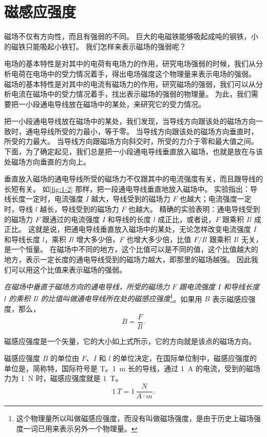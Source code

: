 \section{磁感应强度}
磁场不仅有方向性，而且有强弱的不同。
巨大的电磁铁能够吸起成吨的钢铁，小的磁铁只能吸起小铁钉。
我们怎样来表示磁场的强弱呢？

电场的基本特性是对其中的电荷有电场力的作用，研究电场强弱的时候，我们从分析电荷在电场中的受力情况着手，得出电场强度这个物理量来表示电场的强弱。
磁场的基本特性是对其中的电流有磁场力的作用，研究磁场的强弱，我们可以从分析电流在磁场中的受力情况着手，找出表示磁场的强弱的物理量。
为此，我们需要把一小段通电导线放在磁场中的某处，来研究它的受力情况。

把一小段通电导线放在磁场中的某处，我们发现，当导线方向跟该处的磁场方向一致时，通电导线所受的力最小，等于零。
当导线方向跟该处的磁场方向垂直时，所受的力最大。
当导线方向跟磁场方向斜交时，所受的力介于零和最大值之间。
下面，为了确定起见，我们总是把一小段通电导线垂直放入磁场，也就是放在与该处磁场方向垂直的方向上。

垂直放入磁场的通电导线所受的磁场力不仅跟其中的电流强度有关，而且跟导线的长短有关。
如\cref{fig:1-2} 那样，把一段通电导线垂直地放入磁场中。
实验指出：导线长度一定时，电流强度 $I$ 越大，导线受到的磁场力 $F$ 也越大；电流强度一定时，导线 $l$ 越长，导线受到的磁场力 $F$ 也越大。
精确的实验表明：通电导线受到的磁场力 $F$ 跟通过的电流强度 $I$ 和导线的长度 $l$ 成正比，或者说，$F$ 跟乘积 $Il$ 成正比。
这就是说，把通电导线垂直放入磁场中的某处，无论怎样改变电流强度 $I$ 和导线长度 $l$，乘积 $Il$ 增大多少倍，$F$ 也增大多少倍，比值 $F/Il$ 跟乘积 $Il$ 无关，是一个恒量。
在磁场中不同的地方，这个比值可以是不同的值，这个比值越大的地方，表示一定长度的通电导线受到的磁场力越大，即那里的磁场越强。
因此我们可以用这个比值来表示磁场的强弱。

\emph{在磁场中垂直于磁场方向的通电导线，所受的磁场力 $F$ 跟电流强度 $I$ 和导线长度 $l$ 的乘积 $Il$ 的比值叫做通电导线所在处的磁感应强度}\footnote{这个物理量所以叫做磁感应强度，而没有叫做磁场强度，是由于历史上磁场强度一词已用来表示另外一个物理量。}。如果用 $B$ 表示磁感应强度，那么，
\[B=\frac{F}{Il}.\]

磁感应强度是一个矢量，它的大小如上式所示，它的方向就是该点的磁场方向。

磁感应强度 $B$ 的单位由 $F$、$I$ 和 $l$ 的单位决定，在国际单位制中，磁感应强度的单位是，简称特，国际符号是 \unit{T}。\qty{1}{m} 长的导线，通过 \qty{1}{A} 的电流，受到的磁场力为 \qty{1}{N} 时，磁感应强度就是 \qty{1}{T}。
\[\qty{1}{T}=1\,\frac{\unit{N}}{\unit{A}\cdot \unit{m}}.\]

